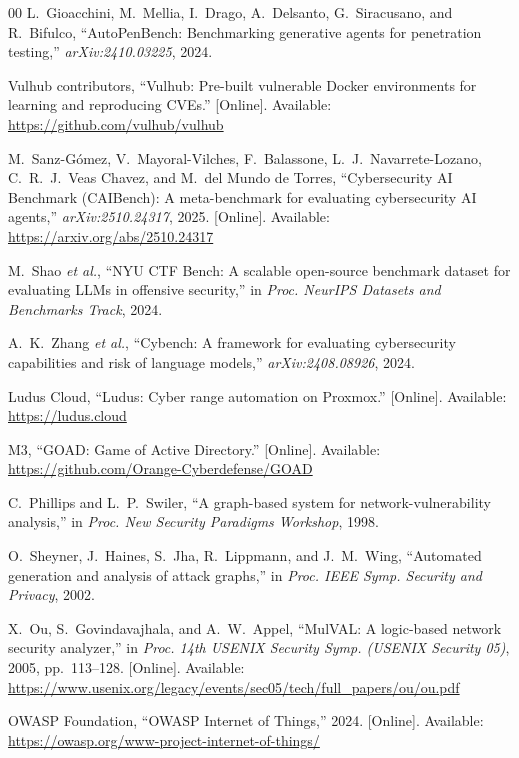 \documentclass[conference,compsoc]{IEEEtran}
\begin{document}
\begin{thebibliography}{00}
 L.~Gioacchini, M.~Mellia, I.~Drago, A.~Delsanto, G.~Siracusano, and R.~Bifulco, ``AutoPenBench: Benchmarking generative agents for penetration testing,'' \textit{arXiv:2410.03225}, 2024.

 Vulhub contributors, ``Vulhub: Pre-built vulnerable Docker environments for learning and reproducing CVEs.'' [Online]. Available: \url{https://github.com/vulhub/vulhub}

 M.~Sanz-G{\'o}mez, V.~Mayoral-Vilches, F.~Balassone, L.~J.~Navarrete-Lozano, C.~R.~J.~Veas Chavez, and M.~del Mundo de Torres, ``Cybersecurity AI Benchmark (CAIBench): A meta-benchmark for evaluating cybersecurity AI agents,'' \textit{arXiv:2510.24317}, 2025. [Online]. Available: \url{https://arxiv.org/abs/2510.24317}

 M.~Shao \textit{et al.}, ``NYU CTF Bench: A scalable open-source benchmark dataset for evaluating LLMs in offensive security,'' in \textit{Proc. NeurIPS Datasets and Benchmarks Track}, 2024.

 A.~K.~Zhang \textit{et al.}, ``Cybench: A framework for evaluating cybersecurity capabilities and risk of language models,'' \textit{arXiv:2408.08926}, 2024.

 Ludus Cloud, ``Ludus: Cyber range automation on Proxmox.'' [Online]. Available: \url{https://ludus.cloud}

 M3, ``GOAD: Game of Active Directory.'' [Online]. Available: \url{https://github.com/Orange-Cyberdefense/GOAD}

 C.~Phillips and L.~P.~Swiler, ``A graph-based system for network-vulnerability analysis,'' in \textit{Proc. New Security Paradigms Workshop}, 1998.

 O.~Sheyner, J.~Haines, S.~Jha, R.~Lippmann, and J.~M.~Wing, ``Automated generation and analysis of attack graphs,'' in \textit{Proc. IEEE Symp. Security and Privacy}, 2002.

 X.~Ou, S.~Govindavajhala, and A.~W.~Appel, ``MulVAL: A logic-based network security analyzer,'' in \textit{Proc. 14th USENIX Security Symp. (USENIX Security 05)}, 2005, pp.~113--128. [Online]. Available: \url{https://www.usenix.org/legacy/events/sec05/tech/full_papers/ou/ou.pdf}

 OWASP Foundation, ``OWASP Internet of Things,'' 2024. [Online]. Available: \url{https://owasp.org/www-project-internet-of-things/}


\end{thebibliography}
\end{document}
